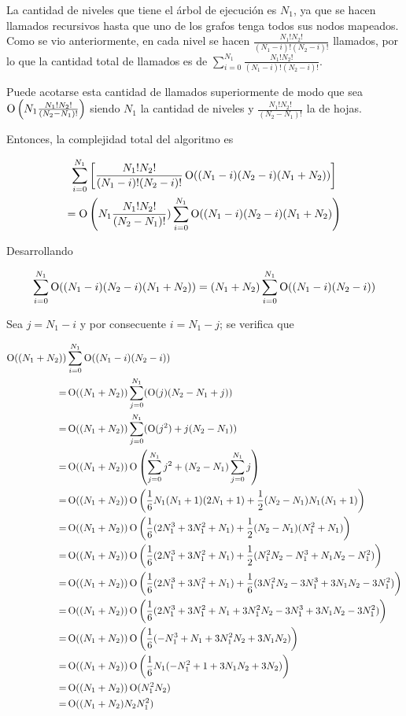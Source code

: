 La cantidad de niveles que tiene el árbol de ejecución es $N_1$, ya que se
hacen llamados recursivos hasta que uno de los grafos tenga todos sus nodos
mapeados. Como se vio anteriormente, en cada nivel se hacen
$\frac{N_1!  N_2!}{(N_1 - i)!  (N_2 - i)!}$ llamados, por lo que
la cantidad total de llamados es de
$\sum_{i = 0}^{N_1} \frac{N_1!  N_2!}{(N_1 - i)!  (N_2 - i)!}$.

Puede acotarse esta cantidad de llamados superiormente de modo que sea
$\operatorname{O} \left(N_1  \frac{N_1!  N_2!}{(N_2 - N_1)!} \right)$ siendo $N_1$ la
cantidad de niveles y $\frac{N_1!  N_2!}{(N_2 - N_1)!}$ la de hojas.

Entonces, la complejidad total del algoritmo es

\begin{multline*}
\sum_{i = 0}^{N_1}\left[\frac{N_1!  N_2!}{(N_1 - i)!  (N_2 - i)!}
\operatorname{O}((N_1 - i)  (N_2 - i)  (N_1 + N_2))\right] \\
= \operatorname{O}\left(N_1  \frac{N_1!  N_2!}{(N_2 - N_1)!})
\sum_{i = 0}^{N_1}\operatorname{O}((N_1 - i)  (N_2 - i)
(N_1 + N_2)\right)
\end{multline*}

Desarrollando

\[
\sum_{i = 0}^{N_1}\operatorname{O}((N_1 - i)  (N_2 - i)
 (N_1 + N_2))=
(N_1 + N_2)  \sum_{i = 0}^{N_1}\operatorname{O}((N_1 - i)  (N_2 - i))
\]

Sea $j = N_1 - i$ y por consecuente $i = N_1 - j$; se verifica que

\begin{align*}
\operatorname{O}((N_1 + N_2)) & \sum_{i = 0}^{N_1} \operatorname{O}((N_1 - i)  (N_2 - i)) \\
=& \operatorname{O}((N_1 + N_2))  \sum_{j = 0}^{N_1} (\operatorname{O}(j)  (N_2 - N_1 + j)) \\
=& \operatorname{O}((N_1 + N_2))  \sum_{j = 0}^{N_1} (\operatorname{O}(j^2) + j  (N_2 - N_1)) \\
=& \operatorname{O}((N_1 + N_2))  \operatorname{O}\left(\sum_{j = 0}^{N_1} j^2 + (N_2 - N_1)  \sum_{j = 0}^{N_1} j\right) \\
=& \operatorname{O}((N_1 + N_2))  \operatorname{O}\left(\frac{1}{6}N_1(N_1 + 1)(2N_1 + 1) + \frac{1}{2}(N_2 - N_1)N_1(N_1 + 1)\right) \\
=& \operatorname{O}((N_1 + N_2))  \operatorname{O}\left(\frac{1}{6}(2N_1^3 + 3N_1^2 + N_1) + \frac{1}{2}(N_2 - N_1)(N_1^2 + N_1)\right) \\
=& \operatorname{O}((N_1 + N_2))  \operatorname{O}\left(\frac{1}{6}(2N_1^3 + 3N_1^2 + N_1) + \frac{1}{2}(N_1^2N_2 - N_1^3 + N_1N_2 - N_1^2)\right) \\
=& \operatorname{O}((N_1 + N_2))  \operatorname{O}\left(\frac{1}{6}(2N_1^3 + 3N_1^2 + N_1) + \frac{1}{6}(3N_1^2N_2 - 3N_1^3 + 3N_1N_2 - 3N_1^2)\right) \\
=& \operatorname{O}((N_1 + N_2))  \operatorname{O}\left(\frac{1}{6}(2N_1^3 + 3N_1^2 + N_1 + 3N_1^2N_2 - 3N_1^3 + 3N_1N_2 - 3N_1^2)\right) \\
=& \operatorname{O}((N_1 + N_2))  \operatorname{O}\left(\frac{1}{6}(-N_1^3 + N_1 + 3N_1^2N_2 + 3N_1N_2)\right) \\
=& \operatorname{O}((N_1 + N_2))  \operatorname{O}\left(\frac{1}{6}N_1(-N_1^2 + 1 + 3N_1N_2 + 3N_2)\right) \\
=& \operatorname{O}((N_1 + N_2))  \operatorname{O}(N_1^2N_2) \\
=& \operatorname{O}((N_1 + N_2)  N_2  N_1^2)
\end{align*}

